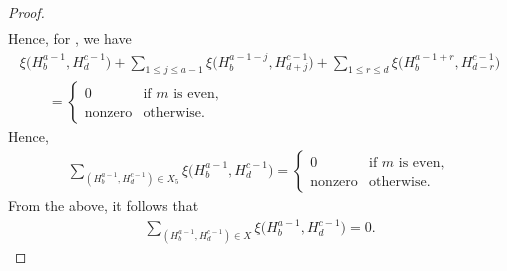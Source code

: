 \documentclass[pdftex]{sigma}
\numberwithin{equation}{section}
\begin{document}
\begin{proof}
\begin{gather*}
\end{gather*}
Hence, for , we have
\begin{gather*}
\xi\bigl(H^{a-1}_{b},H^{c-1}_{d}\bigr)+\sum_{1\leq j \leq a-1}\xi\bigl(H^{a-1-j}_{b},H^{c-1}_{d+j}\bigr)+\sum_{1\leq r \leq d}\xi\bigl(H^{a-1+r}_{b},H^{c-1}_{d-r}\bigr)\\
\qquad{}=\begin{cases}
0 & \text{if $m$ is even},\\
\text{nonzero} & \text{otherwise}.
\end{cases}
\end{gather*}
Hence,
\begin{gather*}
\sum_{(H^{a-1}_{b},H^{c-1}_{d})\in X_5}\xi\bigl(H^{a-1}_{b},H^{c-1}_{d}\bigr)=
\begin{cases}
0 & \text{if $m$ is even},\\
\text{nonzero} & \text{otherwise}.
\end{cases}
\end{gather*}
From the above, it follows that
\begin{align*}
\sum_{(H^{a-1}_{b},H^{c-1}_{d})\in X}\xi\bigl(H^{a-1}_{b},H^{c-1}_{d}\bigr)=0.
\tag*{\qed}
\end{align*}
\renewcommand{\qed}{}
\end{proof}
\end{document}
